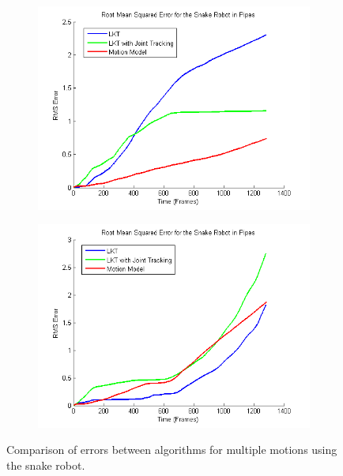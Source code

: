 \documentclass[letterpaper, 10 pt, conference]{ieeeconf}
\begin{document}
\begin{figure}[tb]
	\centering
	\begin{subfigure}{\columnwidth}
		  \centering
		  \includegraphics[width=\columnwidth]{trial8_rms.png}
		  \label{snakes:trial8_error}
	\end{subfigure}
	\begin{subfigure}{\columnwidth}
		  \centering
		  \includegraphics[width=\columnwidth]{trial9_rms.png}
		  \label{snakes:trial9_error}
	\end{subfigure}
	\caption{Comparison of errors between algorithms for multiple motions using the snake robot.}
    \label{snakes_error}
\end{figure}
\end{document}

